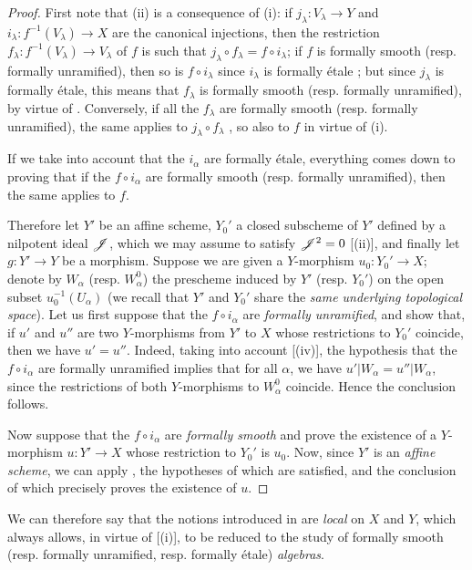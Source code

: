 \begin{proof}
First note that (ii) is a consequence of (i): if $j_\lambda:V_\lambda\to Y$ and $i_\lambda:f^{-1}(V_\lambda)\to X$ are the canonical injections, then the restriction $f_\lambda:f^{-1}(V_\lambda)\to V_\lambda$ of $f$ is such that $j_\lambda\circ f_\lambda=f\circ i_\lambda$;
if $f$ is formally smooth (resp. formally unramified), then so is $f\circ i_\lambda$ since $i_\lambda$ is formally \'etale ;
but since $j_\lambda$ is formally \'etale, this means that $f_\lambda$ is formally smooth (resp. formally unramified), by virtue of .
Conversely, if all the $f_\lambda$ are formally smooth (resp. formally unramified), the same applies to $j_\lambda\circ f_\lambda$ , so also to $f$ in virtue of (i).

If we take into account that the $i_\alpha$ are formally \'etale, everything comes down to proving that if the $f\circ i_\alpha$ are formally smooth (resp. formally unramified), then the same applies to $f$.

Therefore let $Y'$ be an affine scheme, $Y_0'$ a closed subscheme of $Y'$ defined by a nilpotent ideal $\mathscr{J}$, which we may assume to satisfy $\mathscr{J}^2=0$ [(ii)], and finally let $g:Y'\to Y$ be a morphism. 
Suppose we are given a $Y$-morphism $u_0:Y_0'\to X$;
denote by $W_\alpha$ (resp. $W_\alpha^0$) the prescheme induced by $Y'$ (resp. $Y_0'$) on the open subset $u_0^{-1}(U_\alpha)$ (we recall that $Y'$ and $Y_0'$ share the \emph{same underlying topological space}). 
Let us first suppose that the $f\circ i_\alpha$ are \emph{formally unramified}, and show that, if $u'$ and $u''$ are two $Y$-morphisms from $Y'$ to $X$ whose restrictions to $Y_0'$ coincide, then we have $u'=u''$. 
Indeed, taking into account [(iv)], the hypothesis that the $f\circ i_\alpha$ are formally unramified implies that for all $\alpha$, we have $u'|W_\alpha=u''|W_\alpha$, since the restrictions of both $Y$-morphisms to $W_\alpha^0$ coincide. 
Hence the conclusion follows.

Now suppose that the $f\circ i_\alpha$ are \emph{formally smooth} and prove the existence of a $Y$-morphism $u:Y'\to X$ whose restriction to $Y_0'$ is $u_0$.
Now, since $Y'$ is an \emph{affine scheme}, we can apply , the hypotheses of which are satisfied, and the conclusion of which precisely proves the existence of $u$.
\end{proof}

We can therefore say that the notions introduced in  are \emph{local} on $X$ and $Y$, which always allows, in virtue of [(i)], to be reduced to the study of formally smooth (resp. formally unramified, resp. formally \'etale) \emph{algebras}.

